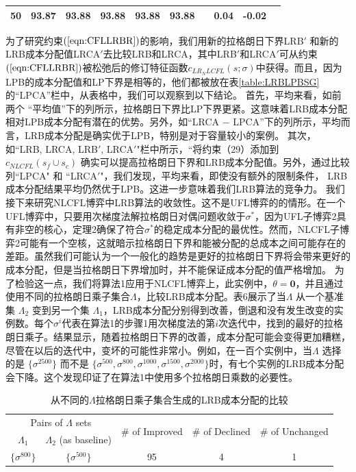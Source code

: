 \documentclass[UTF8]{article}
\begin{document}
\begin{定义}
\begin{table}[H]
\begin{tabular}[!h]{c c c c c c c c c c}
      50    &93.87	&93.88	&93.88	&93.88	&93.88	&	&0.04	&-0.02\\
      \hline
      \end{tabular}
      \vspace{-3mm}
      \end{table}
      为了研究约束$(\ref{eqn:CFLLRBR})$的影响，我们用新的拉格朗日下界LRB$'$ 和新的LRB成本分配值LRCA$'$去比较LRB和LRCA，其中LRB$'$和LRCA$'$可从约束$(\ref{eqn:CFLLRBR})$被松弛后的修订特征函数$c_{LR_NLCFL}(s;\sigma)$中获得。而且，因为LPB的成本分配值和LP下界是相等的，他们都被放在表\ref{table:LRBLPBSG}的“LPCA”栏中，从表格中，我们可以观察到以下结论。
      首先，平均来看，如前两个 “平均值”下的列所示，拉格朗日下界比LP下界更紧。这意味着LRB成本分配相对LPB成本分配有潜在的优势。另外，如``LRCA $-$ LPCA''下的列所示，平均而言，LRB成本分配是确实优于LPB，特别是对于容量较小的案例。
      其次，如``LRB, LRCA, LRB$'$, LRCA$'$"栏中所示，“将约束（29）添加到$c_{NLCFL}(s_f \cup s_c)$ 确实可以提高拉格朗日下界和LRB成本分配值。另外，通过比较列``LPCA" 和 ``LRCA$'$"，我们发现，平均来看，即使没有额外的限制条件， LRB成本分配结果平均仍然优于LPB。这进一步意味着我们LRB算法的竞争力。
      我们接下来研究NLCFL博弈中LRB算法的收敛性。这不是UFL博弈的的情形。在一个UFL博弈中，只要用次梯度法解拉格朗日对偶问题收敛于$\sigma^*$，因为UFL子博弈2具有非空的核心，定理2确保了符合$\sigma^*$的稳定成本分配的最优性。然而，NLCFL子博弈2可能有一个空核，这就暗示拉格朗日下界和能被分配的总成本之间可能存在的差距。虽然我们可能认为一个一般化的趋势是更好的拉格朗日下界将会带来更好的成本分配，但是当拉格朗日下界增加时，并不能保证成本分配的值严格增加。
      为了检验这一点，我们将算法1应用于NLCFL博弈上，此实例中，$\theta=\textbf{0}$，并且通过使用不同的拉格朗日乘子集合$\Lambda$，比较LRB成本分配。表6展示了当$\Lambda$ 从一个基准集 $\Lambda_2$ 变到另一个集 $\Lambda_1$，LRB成本分配分别得到改善，倒退和没有发生改变的实例数。每个$\sigma^{i}$代表在算法1的步骤1用次梯度法的第$i$次迭代中，找到的最好的拉格朗日乘子。结果显示，随着拉格朗日下界的改善，成本分配可能会变得更加糟糕，尽管在以后的迭代中，变坏的可能性非常小。例如，在一百个实例中，当$\Lambda$ 选择的是 $\{\sigma^{2500}\}$ 而不是 $\{\sigma^{500},\sigma^{800},\sigma^{1000},\sigma^{1500},\sigma^{2000}\}$时，有七个实例的LRB成本分配会下降。这个发现印证了在算法1中使用多个拉格朗日乘数的必要性。
      \begin{table}[H]
      \vspace{-2mm}
      \centering
      \tabcolsep=9pt
      \small
      \renewcommand\arraystretch{1.5}
      \caption{\label{table:CFLIterations}
      从不同的$\Lambda$拉格朗日乘子集合生成的LRB成本分配的比较}
      \begin{tabular}[!h]{c c c c c}
      \hline
      \multicolumn{2}{c}{Pairs of $\Lambda$ sets} &\multirow{2}{*}{\# of Improved}	&\multirow{2}{*}{\# of Declined}	&\multirow{2}{*}{\# of Unchanged}\\
      \cline{1-2}
      $\Lambda_1$ &$\Lambda_2$ (as baseline) &\\
      \hline
      $\big\{\sigma^{800}\big\}$  &$\big\{\sigma^{500}\big\}$   &95	&4	&1\\


\end{tabular}
\end{table}
\end{定义}
\end{document}
